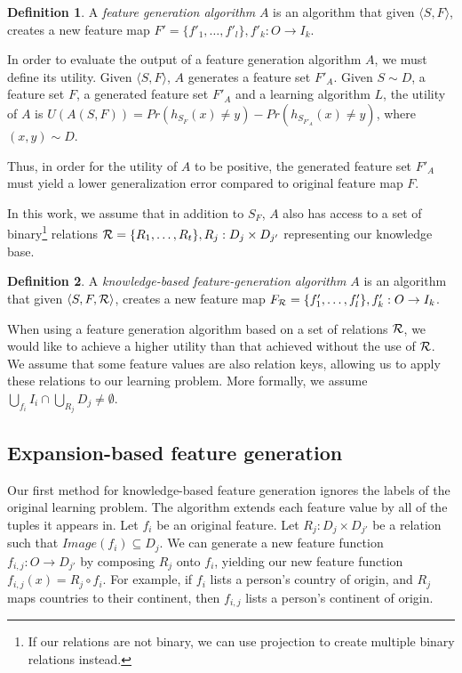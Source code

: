 \documentclass[twoside,11pt]{article}
\theoremstyle{definition}
\newtheorem{defn}{Definition}[section]
\begin{document}
\begin{defn}
	A \emph{feature generation algorithm} $A$ is an algorithm that given $\langle S,F\rangle$, creates a new feature map $F'=\{f'_{1},\ldots,f'_{l}\}, f'_{k}:O\rightarrow I_k$.
\end{defn}

In order to evaluate the output of a feature generation algorithm $A$, we must define its utility. Given $\langle S,F \rangle$, $A$ generates a feature set $F'_A$.
Given $S\sim D$, a feature set $F$, a generated feature set $F'_A$ and a learning algorithm $L$, the utility of $A$ is $U(A(S,F))=Pr(h_{S_F}(x)\neq y)-Pr(h_{S_{F'_A}}(x)\neq y)$, where $(x,y)\sim D$.

Thus, in order for the utility of $A$ to be positive, the generated feature set $F'_A$ must yield a lower generalization error compared to original feature map $F$.

In this work, we assume that in addition to $S_F$, $A$ also has access to a set of binary\footnote{If our relations are not binary, we can use projection to create multiple binary relations instead.} relations ${\cal R}=\{R_{1},\ldots,R_{t}\}, R_j:D_j\times D_{j'}$ representing our knowledge base. 
\begin{defn}
	A \emph{knowledge-based feature-generation algorithm} $A$ is an algorithm that given $\langle S,F,{\cal R} \rangle$, creates a new feature map $F_{{\cal R}}=\{f'_{1},\ldots,f'_{l}\}, f'_{k}:O\rightarrow I_k$.
\end{defn}

When using a feature generation algorithm based on a set of relations ${\cal R}$, we would like to achieve a higher utility than that achieved without the use of ${\cal R}$. We assume that some feature values are also relation keys, allowing us to apply these relations to our learning problem. More formally, we assume 
 $\bigcup_{f_i} I_i \cap \bigcup_{R_j} D_j \neq \emptyset$. 

\subsection{Expansion-based feature generation} \label{shallow_section}

Our first method for knowledge-based feature generation ignores the labels of the original learning problem.
The algorithm extends each feature value by all of the tuples it appears in.
Let $f_i$ be an original feature. Let $R_j:D_j\times D_{j'}$ be a relation such that  $Image(f_i) \subseteq D_j$. We can generate a new feature function $f_{i,j}:O\rightarrow D_{j'}$ by composing $R_j$ onto $f_i$, yielding our new feature function  $f_{i,j}(x)=R_j\circ f_i$. For example, if $f_i$ lists a person's country of origin, and $R_j$ maps countries to their continent, then $f_{i,j}$ lists a person's continent of origin.
\end{document}
